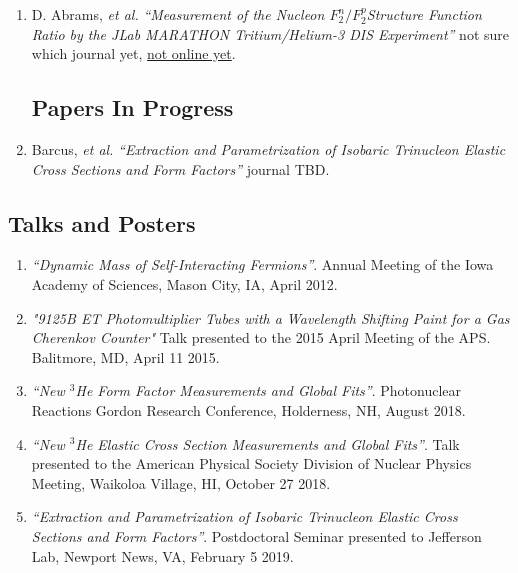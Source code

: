 \documentclass[letterpaper,10pt]{article}
\renewenvironment{itemize}{
  \begin{list}{}{
    \setlength{\leftmargin}{1.5em}
  }
}{
  \end{list}
}
\begin{document}
{\begin{enumerate}
\item D. Abrams, \textit{et al.} \textit{``Measurement of the Nucleon $F_2^n/F_2^p$Structure Function Ratio by the JLab MARATHON Tritium/Helium-3 DIS Experiment''} not sure which journal yet, \url{not online yet}.%
 

\subsection*{Papers In Progress}
\item Barcus, \textit{et al.} \textit{``Extraction and Parametrization of Isobaric Trinucleon Elastic Cross Sections and Form Factors''} journal TBD.

\end{enumerate}
\subsection*{Talks and Posters}


	\begin{enumerate}\itemsep1pt \parskip2pt 
		\setcounter{enumi}{0}
		\item \textit{``Dynamic Mass of Self-Interacting Fermions''}. Annual Meeting of the Iowa Academy of Sciences, Mason City, IA, April 2012.

		\item \textit{"9125B ET Photomultiplier Tubes with a Wavelength Shifting Paint for a Gas Cherenkov Counter"} Talk presented to the 2015 April Meeting of the APS. Balitmore, MD, April 11 2015. 
		
		\item \textit{``New $^3$He Form Factor Measurements and Global Fits''}. Photonuclear Reactions Gordon Research Conference, Holderness, NH, August 2018.
		
		\item \textit{``New $^3$He Elastic Cross Section Measurements and Global Fits''}. Talk presented to the American Physical Society Division of Nuclear Physics Meeting, Waikoloa Village, HI, October 27 2018.
		
		\item \textit{``Extraction and Parametrization of Isobaric Trinucleon Elastic Cross Sections and Form Factors''}. Postdoctoral Seminar presented to Jefferson Lab, Newport News, VA, February 5 2019.
		

\end{enumerate}}
\end{document}
